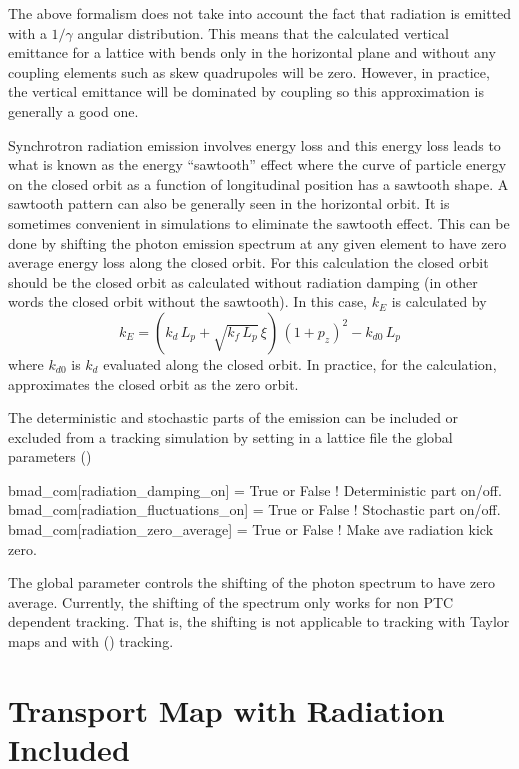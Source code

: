 The above formalism does not take into account the fact that radiation is emitted with a $1/\gamma$
angular distribution. This means that the calculated vertical emittance for a lattice with bends
only in the horizontal plane and without any coupling elements such as skew quadrupoles will be
zero. However, in practice, the vertical emittance will be dominated by coupling so this
approximation is generally a good one.

Synchrotron radiation emission involves energy loss and this energy loss leads to what is known as
the energy ``sawtooth'' effect where the curve of particle energy on the closed orbit as a function
of longitudinal position has a sawtooth shape. A sawtooth pattern can also be generally seen in the
horizontal orbit. It is sometimes convenient in simulations to eliminate the sawtooth effect. This
can be done by shifting the photon emission spectrum at any given element to have zero average
energy loss along the closed orbit. For this calculation the closed orbit should be the closed orbit
as calculated without radiation damping (in other words the closed orbit without the sawtooth). In
this case, $k_E$ is calculated by
\begin{equation}
  k_E = (k_d \, L_p + \sqrt{k_f \, L_p} \, \xi) \, (1 + p_z)^2 - k_{d0} \, L_p
\end{equation}
where $k_{d0}$ is $k_d$ evaluated along the closed orbit. In practice, for the calculation, \bmad
approximates the closed orbit as the zero orbit. 

The deterministic and stochastic parts of the emission can be included or excluded from a tracking
simulation by setting in a lattice file the \bmad global parameters ()
\begin{example}
  bmad_com[radiation_damping_on]      = True or False  ! Deterministic part on/off.
  bmad_com[radiation_fluctuations_on] = True or False  ! Stochastic part on/off.
  bmad_com[radiation_zero_average]    = True or False  ! Make ave radiation kick zero.
\end{example}
The global parameter  controls the shifting of the photon
spectrum to have zero average. Currently, the shifting of the spectrum only works for non PTC
dependent tracking. That is, the shifting is not applicable to tracking with Taylor maps and with
 () tracking.

\section{Transport Map with Radiation Included}
\label{s:map.rad}

